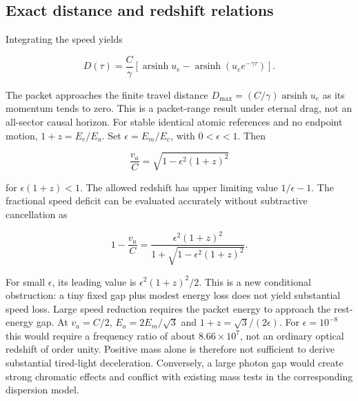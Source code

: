 \documentclass[
  11pt,
  twoside]{article}
\begin{document}
\subsection{Exact distance and redshift
relations}\label{exact-distance-and-redshift-relations}

Integrating the speed yields

\[D(\tau)=\frac{C}{\gamma}\left[\operatorname{arsinh}u_e-\operatorname{arsinh}(u_e e^{-\gamma\tau})\right].\]

The packet approaches the finite travel distance
\(D_{\max}=(C/\gamma)\operatorname{arsinh}u_e\) as its momentum tends to
zero. This is a packet-range result under eternal drag, not an
all-sector causal horizon. For stable identical atomic references and no
endpoint motion, \(1+z=E_e/E_a\). Set \(\epsilon=E_m/E_e\), with
\(0<\epsilon<1\). Then

\[\boxed{\frac{v_a}{C}=\sqrt{1-\epsilon^2(1+z)^2}}\]

for \(\epsilon(1+z)<1\). The allowed redshift has upper limiting value
\(1/\epsilon-1\). The fractional speed deficit can be evaluated
accurately without subtractive cancellation as

\[1-\frac{v_a}{C}=\frac{\epsilon^2(1+z)^2}{1+\sqrt{1-\epsilon^2(1+z)^2}}.\]

For small \(\epsilon\), its leading value is \(\epsilon^2(1+z)^2/2\).
This is a new conditional obstruction: a tiny fixed gap plus modest
energy loss does not yield substantial speed loss. Large speed reduction
requires the packet energy to approach the rest-energy gap. At
\(v_a=C/2\), \(E_a=2E_m/\sqrt3\) and \(1+z=\sqrt3/(2\epsilon)\). For
\(\epsilon=10^{-8}\) this would require a frequency ratio of about
\(8.66\times10^7\), not an ordinary optical redshift of order unity.
Positive mass alone is therefore not sufficient to derive substantial
tired-light deceleration. Conversely, a large photon gap would create
strong chromatic effects and conflict with existing mass tests in the
corresponding dispersion model.
\end{document}
